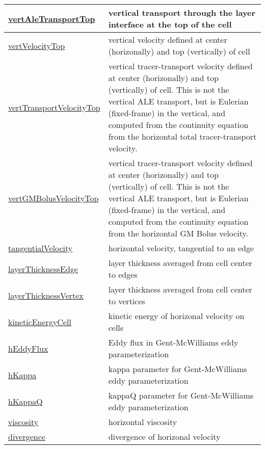 {\begin{center}
\begin{longtable}{| p{2.0in} | p{4.0in} |}
	\hline
	\hyperref[subsec:var_sec_diagnostics_vertAleTransportTop]{vertAleTransportTop} & vertical transport through the layer interface at the top of the cell \\
	\hline
	\hyperref[subsec:var_sec_diagnostics_vertVelocityTop]{vertVelocityTop} & vertical velocity defined at center (horizonally) and top (vertically) of cell \\
	\hline
	\hyperref[subsec:var_sec_diagnostics_vertTransportVelocityTop]{vertTransportVelocityTop} & vertical tracer-transport velocity defined at center (horizonally) and top (vertically) of cell.  This is not the vertical ALE transport, but is Eulerian (fixed-frame) in the vertical, and computed from the continuity equation from the horizontal total tracer-transport velocity. \\
	\hline
	\hyperref[subsec:var_sec_diagnostics_vertGMBolusVelocityTop]{vertGMBolusVelocityTop} & vertical tracer-transport velocity defined at center (horizonally) and top (vertically) of cell.  This is not the vertical ALE transport, but is Eulerian (fixed-frame) in the vertical, and computed from the continuity equation from the horizontal GM Bolus velocity. \\
	\hline
	\hyperref[subsec:var_sec_diagnostics_tangentialVelocity]{tangentialVelocity} & horizontal velocity, tangential to an edge \\
	\hline
	\hyperref[subsec:var_sec_diagnostics_layerThicknessEdge]{layerThicknessEdge} & layer thickness averaged from cell center to edges \\
	\hline
	\hyperref[subsec:var_sec_diagnostics_layerThicknessVertex]{layerThicknessVertex} & layer thickness averaged from cell center to vertices \\
	\hline
	\hyperref[subsec:var_sec_diagnostics_kineticEnergyCell]{kineticEnergyCell} & kinetic energy of horizonal velocity on cells \\
	\hline
	\hyperref[subsec:var_sec_diagnostics_hEddyFlux]{hEddyFlux} & Eddy flux in Gent-McWilliams eddy parameterization \\
	\hline
	\hyperref[subsec:var_sec_diagnostics_hKappa]{hKappa} & kappa parameter for Gent-McWilliams eddy parameterization \\
	\hline
	\hyperref[subsec:var_sec_diagnostics_hKappaQ]{hKappaQ} & kappaQ parameter for Gent-McWilliams eddy parameterization \\
	\hline
	\hyperref[subsec:var_sec_diagnostics_viscosity]{viscosity} & horizontal viscosity \\
	\hline
	\hyperref[subsec:var_sec_diagnostics_divergence]{divergence} & divergence of horizonal velocity \\

\end{longtable}
\end{center}}

